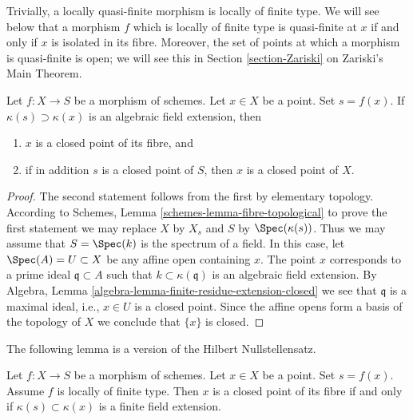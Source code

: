\noindent
Trivially, a locally quasi-finite morphism is locally of finite type.
We will see below that a morphism $f$ which is locally of finite type
is quasi-finite at $x$ if and only if $x$ is isolated in its fibre.
Moreover, the set of points at which a morphism is quasi-finite is open;
we will see this in Section \ref{section-Zariski} on Zariski's Main Theorem.

\begin{lemma}
\label{lemma-algebraic-residue-field-extension-closed-point-fibre}
Let $f : X \to S$ be a morphism of schemes.
Let $x \in X$ be a point. Set $s = f(x)$.
If $\kappa(s) \supset \kappa(x)$
is an algebraic field extension, then
\begin{enumerate}
\item $x$ is a closed point of its fibre, and
\item if in addition $s$ is a closed point of $S$, then
$x$ is a closed point of $X$.
\end{enumerate}
\end{lemma}

\begin{proof}
The second statement follows from the first by elementary topology.
According to Schemes, Lemma \ref{schemes-lemma-fibre-topological}
to prove the first statement
we may replace $X$ by $X_s$ and $S$ by $\Spec(\kappa(s))$.
Thus we may assume that $S = \Spec(k)$ is the spectrum of a field.
In this case, let $\Spec(A) = U \subset X$ be any affine open
containing $x$. The point $x$ corresponds to a prime ideal
$\mathfrak q \subset A$ such that $k \subset \kappa(\mathfrak q)$
is an algebraic field extension. By
Algebra, Lemma \ref{algebra-lemma-finite-residue-extension-closed}
we see that $\mathfrak q$ is a maximal ideal, i.e., $x \in U$ is a
closed point. Since the affine opens form
a basis of the topology of $X$ we conclude that $\{x\}$ is closed.
\end{proof}

\noindent
The following lemma is a version of the Hilbert Nullstellensatz.

\begin{lemma}
\label{lemma-closed-point-fibre-locally-finite-type}
Let $f : X \to S$ be a morphism of schemes.
Let $x \in X$ be a point. Set $s = f(x)$.
Assume $f$ is locally of finite type.
Then $x$ is a closed point of its fibre
if and only if $\kappa(s) \subset \kappa(x)$ is
a finite field extension.
\end{lemma}

